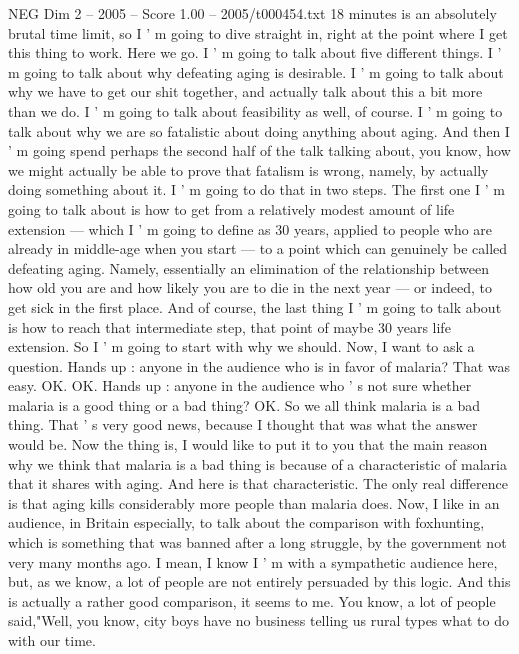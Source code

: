 \begin{textsample}{NEG Dim 2 – 2005 – Score 1.00 – 2005/t000454.txt}  \label{ex:f2_neg_075}
18 minutes is an absolutely brutal time limit, so I ' m going to dive straight in, right at the point where I get this thing to work.
Here we go.
I ' m going to talk about five different things.
I ' m going to talk about why defeating aging is desirable.
I ' m going to talk about why we have to get our shit together, and actually talk about this a bit more than we do.
I ' m going to talk about feasibility as well, of course.
I ' m going to talk about why we are so fatalistic about doing anything about aging.
And then I ' m going spend perhaps the second half of the talk talking about, you know, how we might actually be able to prove that fatalism is wrong, namely, by actually doing something about it.
I ' m going to do that in two steps.
The first one I ' m going to talk about is how to get from a relatively modest amount of life extension — which I ' m going to define as 30 years, applied to people who are already in middle-age when you start — to a point which can genuinely be called defeating aging.
Namely, essentially an elimination of the relationship between how old you are and how likely you are to die in the next year — or indeed, to get sick in the first place.
And of course, the last thing I ' m going to talk about is how to reach that intermediate step, that point of maybe 30 years life extension.
So I ' m going to start with why we should.
Now, I want to ask a question.
Hands up : anyone in the audience who is in favor of malaria?
That was easy.
OK.
OK.
Hands up : anyone in the audience who ' s not sure whether malaria is a good thing or a bad thing?
OK.
So we all think malaria is a bad thing.
That ' s very good news, because I thought that was what the answer would be.
Now the thing is, I would like to put it to you that the main reason why we think that malaria is a bad thing is because of a characteristic of malaria that it shares with aging.
And here is that characteristic.
The only real difference is that aging kills considerably more people than malaria does.
Now, I like in an audience, in Britain especially, to talk about the comparison with foxhunting, which is something that was banned after a long struggle, by the government not very many months ago.
I mean, I know I ' m with a sympathetic audience here, but, as we know, a lot of people are not entirely persuaded by this logic.
And this is actually a rather good comparison, it seems to me.
You know, a lot of people said,"Well, you know, city boys have no business telling us rural types what to do with our time.

\end{textsample}
